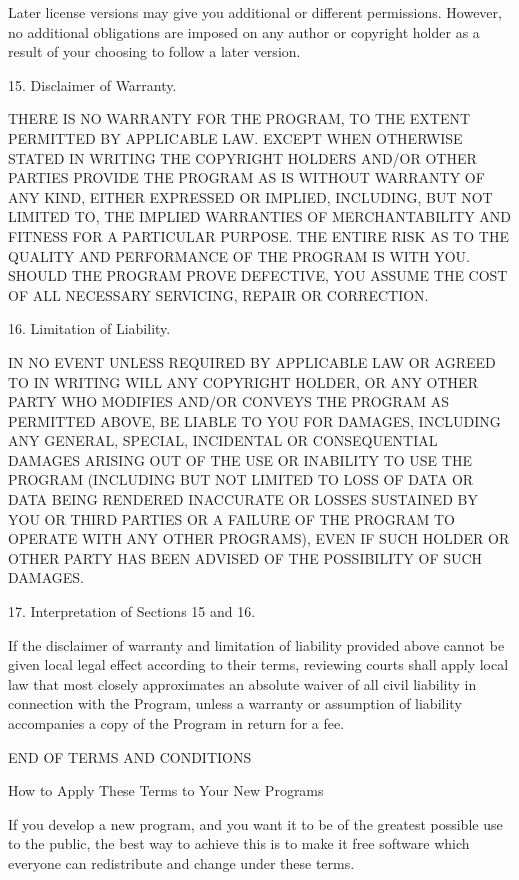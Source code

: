 \documentclass[letterpaper,10pt,english]{sphinxmanual}
\begin{document}
\begin{sphinxVerbatim}[commandchars=\\\{\}]
  Later license versions may give you additional or different
permissions.  However, no additional obligations are imposed on any
author or copyright holder as a result of your choosing to follow a
later version.

  15. Disclaimer of Warranty.

  THERE IS NO WARRANTY FOR THE PROGRAM, TO THE EXTENT PERMITTED BY
APPLICABLE LAW.  EXCEPT WHEN OTHERWISE STATED IN WRITING THE COPYRIGHT
HOLDERS AND/OR OTHER PARTIES PROVIDE THE PROGRAM \PYGZdq{}AS IS\PYGZdq{} WITHOUT WARRANTY
OF ANY KIND, EITHER EXPRESSED OR IMPLIED, INCLUDING, BUT NOT LIMITED TO,
THE IMPLIED WARRANTIES OF MERCHANTABILITY AND FITNESS FOR A PARTICULAR
PURPOSE.  THE ENTIRE RISK AS TO THE QUALITY AND PERFORMANCE OF THE PROGRAM
IS WITH YOU.  SHOULD THE PROGRAM PROVE DEFECTIVE, YOU ASSUME THE COST OF
ALL NECESSARY SERVICING, REPAIR OR CORRECTION.

  16. Limitation of Liability.

  IN NO EVENT UNLESS REQUIRED BY APPLICABLE LAW OR AGREED TO IN WRITING
WILL ANY COPYRIGHT HOLDER, OR ANY OTHER PARTY WHO MODIFIES AND/OR CONVEYS
THE PROGRAM AS PERMITTED ABOVE, BE LIABLE TO YOU FOR DAMAGES, INCLUDING ANY
GENERAL, SPECIAL, INCIDENTAL OR CONSEQUENTIAL DAMAGES ARISING OUT OF THE
USE OR INABILITY TO USE THE PROGRAM (INCLUDING BUT NOT LIMITED TO LOSS OF
DATA OR DATA BEING RENDERED INACCURATE OR LOSSES SUSTAINED BY YOU OR THIRD
PARTIES OR A FAILURE OF THE PROGRAM TO OPERATE WITH ANY OTHER PROGRAMS),
EVEN IF SUCH HOLDER OR OTHER PARTY HAS BEEN ADVISED OF THE POSSIBILITY OF
SUCH DAMAGES.

  17. Interpretation of Sections 15 and 16.

  If the disclaimer of warranty and limitation of liability provided
above cannot be given local legal effect according to their terms,
reviewing courts shall apply local law that most closely approximates
an absolute waiver of all civil liability in connection with the
Program, unless a warranty or assumption of liability accompanies a
copy of the Program in return for a fee.

                     END OF TERMS AND CONDITIONS

            How to Apply These Terms to Your New Programs

  If you develop a new program, and you want it to be of the greatest
possible use to the public, the best way to achieve this is to make it
free software which everyone can redistribute and change under these terms.


\end{sphinxVerbatim}
\end{document}
